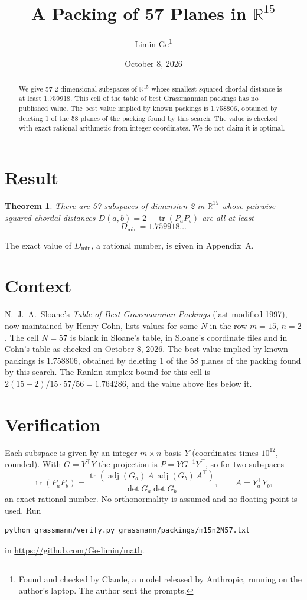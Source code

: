 \documentclass[11pt,a4paper]{article}
\title{A Packing of 57 Planes in $\mathbb{R}^{15}$}
\author{Limin Ge\thanks{Found and checked by Claude, a model released by Anthropic, running on the author's laptop. The author sent the prompts.}}
\date{October 8, 2026}
\newtheorem*{theorem}{Theorem}
\begin{document}
\maketitle
\begin{abstract}
We give 57 2-dimensional subspaces of $\mathbb{R}^{15}$ whose smallest squared chordal distance is at least 1.759918. This cell of the table of best Grassmannian packings has no published value. The best value implied by known packings is 1.758806, obtained by deleting 1 of the 58 planes of the packing found by this search. The value is checked with exact rational arithmetic from integer coordinates. We do not claim it is optimal.
\end{abstract}

\section{Result}
\begin{theorem}
There are 57 subspaces of dimension 2 in $\mathbb{R}^{15}$ whose pairwise squared chordal distances $D(a,b) = 2 - \operatorname{tr}(P_aP_b)$ are all at least
\[ D_{\min} = 1.759918\ldots \]
\end{theorem}
The exact value of $D_{\min}$, a rational number, is given in Appendix~A.


\section{Context}
N.~J.~A.~Sloane's \emph{Table of Best Grassmannian Packings} (last modified 1997), now maintained by Henry Cohn, lists values for some $N$ in the row $m=15$, $n=2$. The cell $N=57$ is blank in Sloane's table, in Sloane's coordinate files and in Cohn's table as checked on October 8, 2026. The best value implied by known packings is 1.758806, obtained by deleting 1 of the 58 planes of the packing found by this search. The Rankin simplex bound for this cell is $2(15-2)/15\cdot 57/56 = 1.764286$, and the value above lies below it.


\section{Verification}
Each subspace is given by an integer $m\times n$ basis $Y$ (coordinates times $10^{12}$, rounded). With $G=Y^\top Y$ the projection is $P=YG^{-1}Y^\top$, so for two subspaces
\[ \operatorname{tr}(P_aP_b)=\frac{\operatorname{tr}(\operatorname{adj}(G_a)\,A\,\operatorname{adj}(G_b)\,A^\top)}{\det G_a\det G_b},\qquad A=Y_a^\top Y_b, \]
an exact rational number. No orthonormality is assumed and no floating point is used. Run
\begin{verbatim}
python grassmann/verify.py grassmann/packings/m15n2N57.txt
\end{verbatim}
in \url{https://github.com/Ge-limin/math}.
\end{document}
